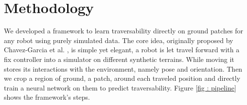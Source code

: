 \documentclass[../document.tex]{subfiles}
\begin{document}
\chapter{Methodology}
\label{chap: methodology}
We developed a framework to learn traversability directly on ground patches for any robot using purely simulated data. The core idea, originally proposed by Chavez-Garcia et al. \cite{omar2018traversability}, is simple yet elegant, a robot is let travel forward with a fix controller into a simulator on different synthetic terrains. While moving it stores its interactions with the environment, namely pose and orientation. Then we crop a region of ground, a patch, around each traveled position and directly train a neural network on them to predict traversability. Figure \ref{fig : pipeline} shows the framework's steps.
\end{document}
